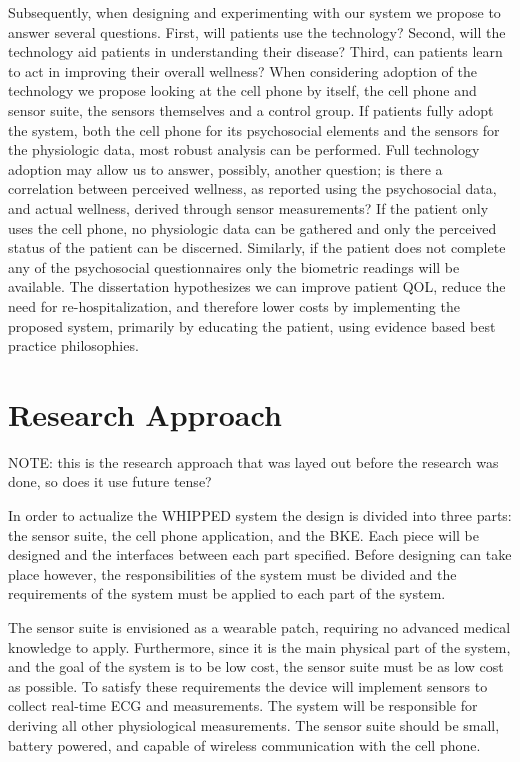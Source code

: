 Subsequently, when designing and experimenting with our system we propose to answer several questions. First, will patients use the technology? Second, will the technology aid patients in understanding their disease?  Third, can patients learn to act in improving their overall wellness? When considering adoption of the technology we propose looking at the cell phone by itself, the cell phone and sensor suite, the sensors themselves and a control group. If patients fully adopt the system, both the cell phone for its psychosocial elements and the sensors for the physiologic data, most robust analysis can be performed. Full technology adoption may allow us to answer, possibly, another question; is there a correlation between perceived wellness, as reported using the psychosocial data, and actual wellness, derived through sensor measurements? If the patient only uses the cell phone, no physiologic data can be gathered and only the perceived status of the patient can be discerned. Similarly, if the patient does not complete any of the psychosocial questionnaires only the biometric readings will be available. The dissertation hypothesizes we can improve patient QOL, reduce the need for re-hospitalization, and therefore lower costs by implementing the proposed system, primarily by educating the patient, using evidence based best practice philosophies.


\section{Research Approach}

NOTE: this is the research approach that was layed out before the research was done, so does it use future tense?

In order to actualize the WHIPPED system the design is divided into three parts: the sensor suite, the cell phone application, and the BKE. Each piece will be designed and the interfaces between each part specified. Before designing can take place however, the responsibilities of the system must be divided and the requirements of the system must be applied to each part of the system.

The sensor suite is envisioned as a wearable patch, requiring no advanced medical knowledge to apply. Furthermore, since it is the main physical part of the system, and the goal of the system is to be low cost, the sensor suite must be as low cost as possible. To satisfy these requirements the device will implement sensors to collect real-time ECG and  measurements. The system will be responsible for deriving all other physiological measurements. The sensor suite should be small, battery powered, and capable of wireless communication with the cell phone. 


